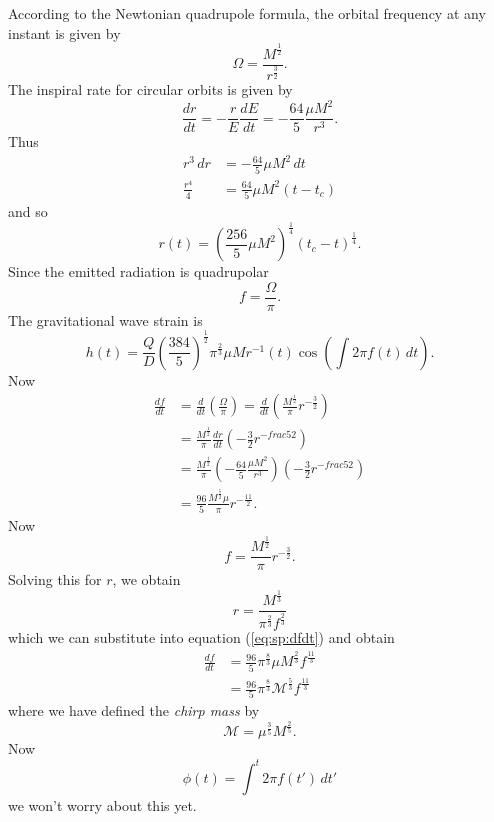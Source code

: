 According to the Newtonian quadrupole formula, the orbital frequency at any
instant is given by
\begin{equation}
\Omega = \frac{M^{\frac{1}{2}}}{r^{\frac{3}{2}}}.
\end{equation}
The inspiral rate for circular orbits is given by
\begin{equation}
\frac{dr}{dt} = - \frac{r}{E} \frac{dE}{dt} = 
- \frac{64}{5} \frac{\mu M^2}{r^3}.
\end{equation}
Thus
\begin{align}
r^3 \, dr &= - \frac{64}{5} \mu M^2 \, dt \\
\frac{r^4}{4} &= \frac{64}{5} \mu M^2 (t - t_c)
\end{align}
and so
\begin{equation}
r(t) = \left(\frac{256}{5} \mu M^2 \right)^{\frac{1}{4}}
       \left(t_c - t\right)^{\frac{1}{4}}.
\end{equation}
Since the emitted radiation is quadrupolar
\begin{equation}
f = \frac{\Omega}{\pi}.
\end{equation}
The gravitational wave strain is
\begin{equation}
h(t) = \frac{Q}{D} \left(\frac{384}{5}\right)^\frac{1}{2} \pi^\frac{2}{3} \mu M
r^{-1}(t) \cos \left( \int 2\pi f(t) \, dt \right).
\end{equation}
Now
\begin{align}
\frac{df}{dt} 
     &= \frac{d}{dt} \left(\frac{\Omega}{\pi}\right) 
      = \frac{d}{dt} \left(\frac{M^\frac{1}{2}}{\pi} r^{-\frac{3}{2}}\right) \\
     &= \frac{M^\frac{1}{2}}{\pi} \frac{dr}{dt} \left(-\frac{3}{2} r^{-frac{5}{2}}\right) \\
     &= \frac{M^\frac{1}{2}}{\pi} \left(-\frac{64}{5} \frac{\mu M^2}{r^3}\right)
        \left(-\frac{3}{2} r^{-frac{5}{2}}\right) \\
     &= \frac{96}{5} \frac{M^\frac{5}{2} \mu}{\pi} r^{-\frac{11}{2}}. 
     \label{eq:sp:dfdt}
\end{align}
Now
\begin{equation}
f = \frac{M^\frac{1}{2}}{\pi} r^{-\frac{3}{2}}.
\end{equation}
Solving this for $r$, we obtain
\begin{equation}
r = \frac{M^\frac{1}{3}}{\pi^\frac{2}{3} f^\frac{2}{3}}
\end{equation}
which we can substitute into equation (\ref{eq:sp:dfdt}) and obtain
\begin{align}
\frac{df}{dt} &= \frac{96}{5} \pi^\frac{8}{3} \mu M^\frac{2}{3} f^\frac{11}{3} \\
&= \frac{96}{5} \pi^\frac{8}{3} \mathcal{M}^\frac{5}{3} f^\frac{11}{3}
\end{align}
where we have defined the \emph{chirp mass} by
\begin{equation}
\mathcal{M} = \mu^\frac{3}{5} M^\frac{2}{5}.
\end{equation}
Now
\begin{equation}
\phi(t) = \int^t 2\pi f(t') \, dt'
\end{equation}
we won't worry about this yet.

